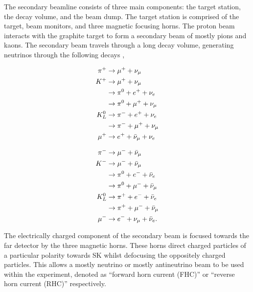 The secondary beamline consists of three main components: the target station, the decay volume, and the beam dump. The target station is comprised of the target, beam monitors, and three magnetic focusing horns. The proton beam interacts with the graphite target to form a secondary beam of mostly pions and kaons. The secondary beam travels through a  long decay volume, generating neutrinos through the following decays \cite{PhysRevD.87.012001},

\begin{minipage}{.45\linewidth}
  \begin{equation}
    \begin{split}
      \pi^+ &\rightarrow \mu^+ + \nu_\mu \\
      K^+ &\rightarrow \mu^+ + \nu_\mu \\
      &\rightarrow \pi^0 + e^+ + \nu_e \\
      &\rightarrow \pi^0 + \mu^+ + \nu_\mu \\
      K^0_L &\rightarrow \pi^- + e^+ + \nu_e \\
      &\rightarrow \pi^- + \mu^+ + \nu_\mu \\
      \mu^+ &\rightarrow e^+ + \bar{\nu}_\mu + \nu_e  \notag
    \end{split}
  \end{equation}
\end{minipage}%
\begin{minipage}{.45\linewidth}
  \begin{equation}
    \begin{split}
      \pi^- &\rightarrow \mu^- + \bar{\nu}_\mu\\
      K^- &\rightarrow \mu^- + \bar{\nu}_\mu \\
      &\rightarrow \pi^0 + e^- + \bar{\nu}_e\\
      &\rightarrow \pi^0 + \mu^- + \bar{\nu}_\mu \\
      K^0_L &\rightarrow \pi^+ + e^- + \bar{\nu}_e \\
      &\rightarrow \pi^+ + \mu^- + \bar{\nu}_\mu \\
      \mu^- &\rightarrow e^- + \nu_\mu + \bar{\nu}_e .  \notag
    \end{split}
  \end{equation}
\end{minipage}

The electrically charged component of the secondary beam is focused towards the far detector by the three magnetic horns. These horns direct charged particles of a particular polarity towards SK whilst defocusing the oppositely charged particles. This allows a mostly neutrino or mostly antineutrino beam to be used within the experiment, denoted as ``forward horn current (FHC)'' or ``reverse horn current (RHC)'' respectively.

